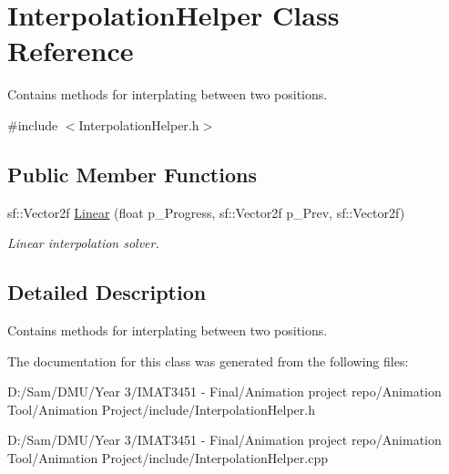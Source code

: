 \hypertarget{class_interpolation_helper}{}\section{Interpolation\+Helper Class Reference}
\label{class_interpolation_helper}


Contains methods for interplating between two positions.  




{\ttfamily \#include $<$Interpolation\+Helper.\+h$>$}

\subsection*{Public Member Functions}
\begin{DoxyCompactItemize}
\item 
\mbox{\label{class_interpolation_helper_aa2fba4f6c109fd6541e9fce8729d469f}} 
sf\+::\+Vector2f \hyperlink{class_interpolation_helper_aa2fba4f6c109fd6541e9fce8729d469f}{Linear} (float p\+\_\+\+Progress, sf\+::\+Vector2f p\+\_\+\+Prev, sf\+::\+Vector2f)
\begin{DoxyCompactList}\small\item\em Linear interpolation solver. \end{DoxyCompactList}\end{DoxyCompactItemize}


\subsection{Detailed Description}
Contains methods for interplating between two positions. 

The documentation for this class was generated from the following files\+:\begin{DoxyCompactItemize}
\item 
D\+:/\+Sam/\+D\+M\+U/\+Year 3/\+I\+M\+A\+T3451 -\/ Final/\+Animation project repo/\+Animation Tool/\+Animation Project/include/Interpolation\+Helper.\+h\item 
D\+:/\+Sam/\+D\+M\+U/\+Year 3/\+I\+M\+A\+T3451 -\/ Final/\+Animation project repo/\+Animation Tool/\+Animation Project/include/Interpolation\+Helper.\+cpp\end{DoxyCompactItemize}
